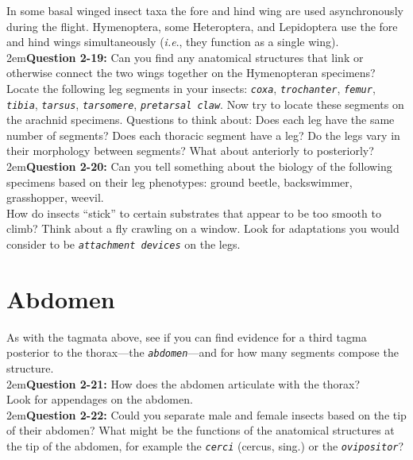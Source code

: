 \documentclass[letterpaper, 11pt]{article}
\newcommand{\latinword}[1]{\texttt{\itshape #1}}%
\begin{document}
\noindent{}In some basal winged insect taxa the fore and hind wing are used asynchronously during the flight. Hymenoptera, some Heteroptera, and Lepidoptera use the fore and hind wings simultaneously (\textit{i.e}., they function as a single wing). \\ 

\hangindent2em\textbf{Question 2-19:} Can you find any anatomical structures that link or otherwise connect the two wings together on the Hymenopteran specimens?\\

\noindent{}Locate the following leg segments in your insects: \latinword{coxa}, \latinword{trochanter}, \latinword{femur}, \latinword{tibia}, \latinword{tarsus}, \latinword{tarsomere}, \latinword{pretarsal claw}. Now try to locate these segments on the arachnid specimens. Questions to think about: Does each leg have the same number of segments? Does each thoracic segment have a leg? Do the legs vary in their morphology between segments? What about anteriorly to posteriorly?\\


\hangindent2em\textbf{Question 2-20:} Can you tell something about the biology of the following specimens based on their leg phenotypes: ground beetle, backswimmer, grasshopper, weevil.\\

\noindent{}How do insects ``stick'' to certain substrates that appear to be too smooth to climb? Think about a fly crawling on a window. Look for adaptations you would consider to be \latinword{attachment devices} on the legs.\\

\section{Abdomen}
As with the tagmata above, see if you can find evidence for a third tagma posterior to the thorax---the \latinword{abdomen}---and for how many segments compose the structure.\\

\hangindent2em\textbf{Question 2-21:} How does the abdomen articulate with the thorax?\\

\noindent{}Look for appendages on the abdomen. \\

\hangindent2em\textbf{Question 2-22:} Could you separate male and female insects based on the tip of their abdomen? What might be the functions of the anatomical structures at the tip of the abdomen, for example the \latinword{cerci} (cercus, sing.) or the \latinword{ovipositor}? \\
\end{document}
